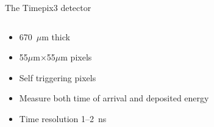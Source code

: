 \documentclass{beamer}
\begin{document}
\begin{frame}{\centering The Timepix3 detector}
  \begin{columns}
    \begin{column}{0.5\textwidth}
      \begin{itemize}
      \item{670~$\mu$m thick}
      \item{55$\mu$m$\times$55$\mu$m pixels}
      \item{Self triggering pixels}
      \item{Measure both time of arrival and deposited energy}
      \item{Time resolution 1--2~ns}
      \end{itemize}
     \end{column}
    \begin{column}{0.5\textwidth}
    \end{column}
  \end{columns}
 \end{frame}
\end{document}
